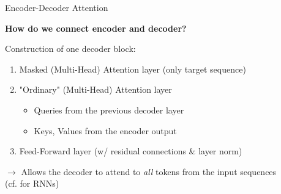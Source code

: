 \documentclass[11pt,compress,t,notes=noshow, xcolor=table]{beamer}
\begin{document}

\begin{vbframe}{Encoder-Decoder Attention}

\vfill

\textbf{\ques How do we connect encoder and decoder?}\\

\vspace{.3cm}
	
Construction of one decoder block:

\vspace{.3cm}
	
	\begin{enumerate}
		\item Masked (Multi-Head) Attention layer (only target sequence)
		\item "Ordinary" (Multi-Head) Attention layer
			\begin{itemize}
				\item Queries from the previous decoder layer
				\item Keys, Values from the encoder output
			\end{itemize}
		\item Feed-Forward layer (w/ residual connections \& layer norm)
	\end{enumerate}
	
\vspace{.3cm}
	
$\to$ Allows the decoder to attend to \textit{all} tokens from the input sequences\\
(cf.  for RNNs)

\vfill

\end{vbframe}

\end{document}
